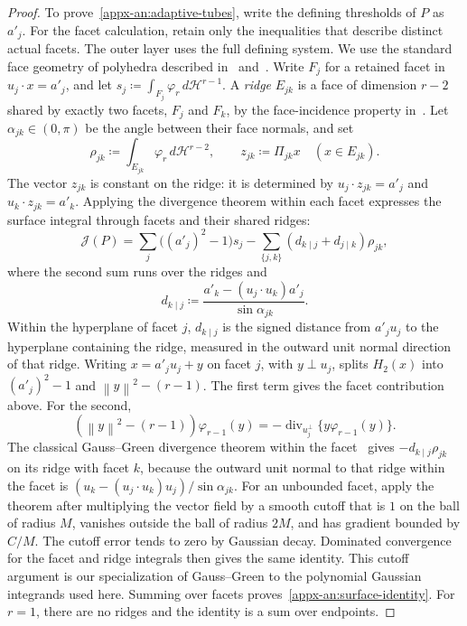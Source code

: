 \documentclass[11pt,letterpaper]{article}
\theoremstyle{remark}
\newcommand{\norm}[1]{\left\lVert#1\right\rVert}
\newcommand{\dd}{\,d}
\newcommand{\surf}{\mathcal J}
\begin{document}
\begin{proof}
To prove~\eqref{appx-an:adaptive-tubes}, write the defining thresholds
of \(P\) as \(a'_j\). For the facet calculation, retain only the
inequalities that describe distinct actual facets. The outer layer
uses the full defining system. We use the standard face geometry
of polyhedra described in~\cite[\S\S18--19]{Rockafellar1970}
and~\cite[Chapter~2]{Ziegler1995}. Write \(F_j\) for a retained
facet in \(u_j\cdot x=a'_j\), and let
\(s_j\coloneqq \int_{F_j}\varphi_r\dd\mathcal H^{r-1}\).
A \emph{ridge} \(E_{jk}\) is a face of dimension \(r-2\) shared by exactly
two facets, \(F_j\) and \(F_k\), by the face-incidence property
in~\cite[Chapter~2]{Ziegler1995}. Let \(\alpha_{jk}\in(0,\pi)\) be the
angle between their face normals, and set
\[
 \rho_{jk}\coloneqq \int_{E_{jk}}\varphi_r\dd\mathcal H^{r-2},\qquad
 z_{jk}\coloneqq \Pi_{jk}x\quad(x\in E_{jk}).
\]
The vector \(z_{jk}\) is constant on the ridge: it is determined by
\(u_j\cdot z_{jk}=a'_j\) and \(u_k\cdot z_{jk}=a'_k\).
Applying the divergence theorem within each facet expresses the
surface integral through facets and their shared ridges:
\begin{equation}
 \surf(P)=\sum_j\bigl((a'_j)^2-1\bigr)s_j
       -\sum_{\{j,k\}}(d_{k\mid j}+d_{j\mid k})\rho_{jk},
 \label{appx-an:surface-identity}
\end{equation}
where the second sum runs over the ridges and
\[
 d_{k\mid j}\coloneqq \frac{a'_k-(u_j\cdot u_k)a'_j}{\sin\alpha_{jk}}.
\]
Within the hyperplane of facet \(j\), \(d_{k\mid j}\) is the signed
distance from \(a'_ju_j\) to the hyperplane containing the ridge,
measured in the outward unit normal direction of that ridge.
Writing \(x=a'_ju_j+y\) on facet \(j\), with \(y\perp u_j\),
splits \(H_2(x)\) into \((a'_j)^2-1\) and \(\norm y^2-(r-1)\).
The first term gives the facet contribution above. For the second,
\[
 (\norm y^2-(r-1))\varphi_{r-1}(y)
 =-\operatorname{div}_{u_j^\perp}\{y\varphi_{r-1}(y)\}.
\]
The classical Gauss--Green divergence theorem within the
facet~\cite[Chapter~5]{EvansGariepy2015} gives
\(-d_{k\mid j}\rho_{jk}\) on its ridge with facet \(k\), because
the outward unit normal to that ridge within the facet is
\((u_k-(u_j\cdot u_k)u_j)/\sin\alpha_{jk}\).
For an unbounded facet, apply the theorem after multiplying the
vector field by a smooth cutoff that is \(1\) on the ball of radius
\(M\), vanishes outside the ball of radius \(2M\), and has gradient
bounded by \(C/M\). The cutoff error tends to zero by Gaussian decay.
Dominated convergence for the facet and ridge integrals then gives
the same identity. This cutoff argument is our specialization of
Gauss--Green to the polynomial Gaussian integrands used here.
Summing over facets proves~\eqref{appx-an:surface-identity}.
For \(r=1\), there are no ridges and the identity is a sum over endpoints.


\end{proof}
\end{document}
